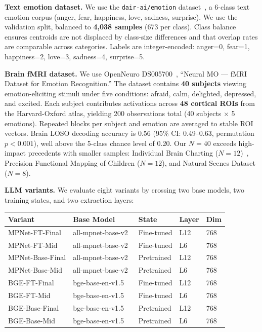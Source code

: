 \documentclass{article}
\begin{document}
\textbf{Text emotion dataset.}
We use the \texttt{dair-ai/emotion} dataset~\citep{saravia2018}, a 6-class text emotion
corpus (anger, fear, happiness, love, sadness, surprise).
We use the validation split, balanced to \textbf{4,038 samples} (673 per class).
Class balance ensures centroids are not displaced by class-size differences and that
overlap rates are comparable across categories.
Labels are integer-encoded: anger=0, fear=1, happiness=2, love=3, sadness=4, surprise=5.

\textbf{Brain fMRI dataset.}
We use OpenNeuro DS005700~\citep{openneuro2024}, ``Neural MO --- fMRI Dataset for
Emotion Recognition.''
The dataset contains \textbf{40 subjects} viewing emotion-eliciting stimuli under five
conditions: afraid, calm, delighted, depressed, and excited.
Each subject contributes activations across \textbf{48 cortical ROIs} from the
Harvard-Oxford atlas, yielding 200 observations total (40 subjects $\times$ 5 emotions).
Repeated blocks per subject and emotion are averaged to stable ROI vectors.
Brain LOSO decoding accuracy is 0.56 (95\% CI: 0.49--0.63, permutation $p<0.001$),
well above the 5-class chance level of 0.20.
Our $N\!=\!40$ exceeds high-impact precedents with smaller samples:
Individual Brain Charting ($N\!=\!12$)~\citep{openneuro2024},
Precision Functional Mapping of Children ($N\!=\!12$), and
Natural Scenes Dataset ($N\!=\!8$).

\textbf{LLM variants.}
We evaluate eight variants by crossing two base models, two training states, and two
extraction layers:

\begin{center}
\small
\begin{tabular}{lllll}
\toprule
Variant & Base Model & State & Layer & Dim \\
\midrule
MPNet-FT-Final  & all-mpnet-base-v2~\citep{song2020} & Fine-tuned & L12 & 768 \\
MPNet-FT-Mid    & all-mpnet-base-v2 & Fine-tuned & L6  & 768 \\
MPNet-Base-Final& all-mpnet-base-v2 & Pretrained & L12 & 768 \\
MPNet-Base-Mid  & all-mpnet-base-v2 & Pretrained & L6  & 768 \\
BGE-FT-Final    & bge-base-en-v1.5~\citep{xiao2023} & Fine-tuned & L12 & 768 \\
BGE-FT-Mid      & bge-base-en-v1.5 & Fine-tuned & L6  & 768 \\
BGE-Base-Final  & bge-base-en-v1.5 & Pretrained & L12 & 768 \\
BGE-Base-Mid    & bge-base-en-v1.5 & Pretrained & L6  & 768 \\
\bottomrule
\end{tabular}
\end{center}
\end{document}
